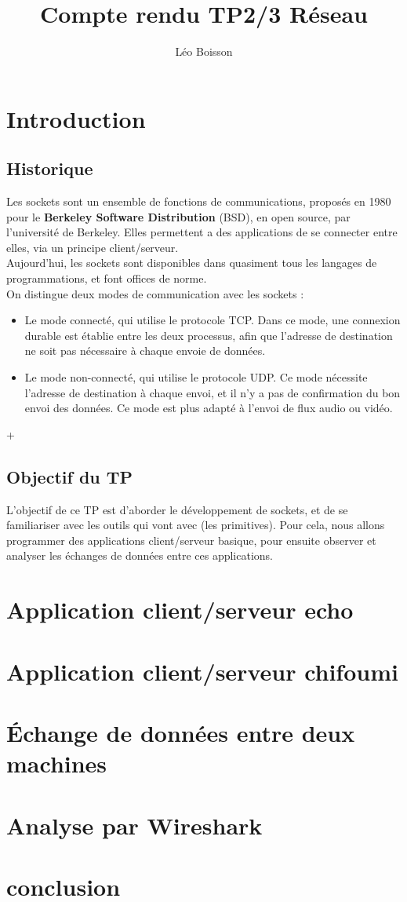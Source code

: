 \documentclass[10pt,a4paper,final]{article}
\author{Léo Boisson}
\title{\textbf{Compte rendu TP2/3 Réseau}}
\begin{document}
\date{}
\maketitle  
\tableofcontents  
\newpage

\section{Introduction} 

	\subsection{Historique}
		Les sockets sont un ensemble de fonctions de communications, proposés en 1980 pour le \textbf{Berkeley Software Distribution} (BSD), en open source, par 								l'université de Berkeley. Elles permettent a des applications de se connecter entre elles, via un principe client/serveur.	\\
		Aujourd'hui, les sockets sont disponibles dans quasiment tous les langages de programmations, et font offices de norme.\\
		On distingue deux modes de communication avec les sockets :\\
		\begin{itemize}
		\item
			Le mode connecté, qui utilise le protocole TCP. Dans ce mode, une connexion durable est établie entre les deux processus, afin que l'adresse de destination ne 					soit pas nécessaire à chaque envoie de données.
		\item
			Le mode non-connecté, qui utilise le protocole UDP. Ce mode nécessite l'adresse de destination à chaque envoi, et il n'y a pas de confirmation du bon envoi des
			données. Ce mode est plus adapté à l'envoi de flux audio ou vidéo.
		\end{itemize}+
		
	\subsection{Objectif du TP}
		L'objectif de ce TP est d'aborder le développement de sockets, et de se familiariser avec les outils qui vont avec (les primitives). Pour cela, nous allons 
		programmer des applications client/serveur basique, pour ensuite observer et analyser les échanges de données entre ces applications.
	
	
\section{Application client/serveur echo}


\section{Application client/serveur chifoumi}


\section{Échange de données entre deux machines}


\section{Analyse par Wireshark}


\section{conclusion}
\end{document}
